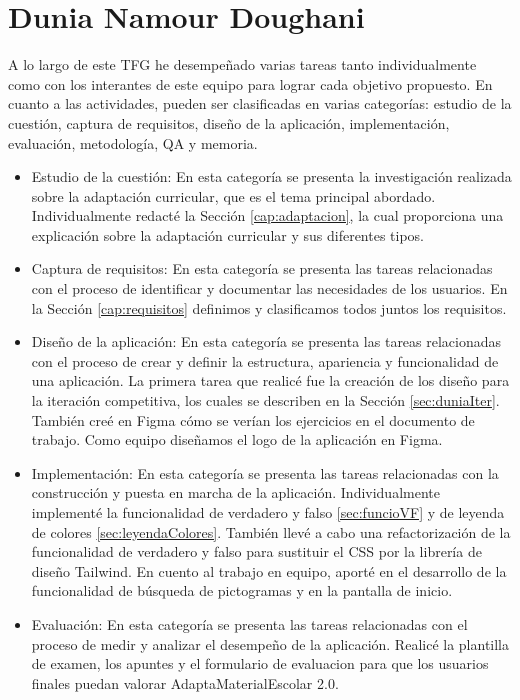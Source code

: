 \section{Dunia Namour Doughani}
A lo largo de este TFG he desempeñado varias tareas tanto individualmente como con los interantes de este equipo para lograr cada objetivo propuesto. En cuanto a las actividades, pueden ser clasificadas en varias categorías: estudio de la cuestión, captura de requisitos, diseño de la aplicación, implementación, evaluación, metodología, QA y memoria.
\begin{itemize}
    \item  Estudio de la cuestión: En esta categoría se presenta la investigación realizada sobre la adaptación curricular, que es el tema principal abordado. Individualmente redacté la Sección \ref{cap:adaptacion}, la cual proporciona una explicación sobre la adaptación curricular y sus diferentes tipos.
    \item Captura de requisitos: En esta categoría se presenta las tareas relacionadas con el proceso de identificar y documentar las necesidades de los usuarios. En la Sección \ref{cap:requisitos} definimos y clasificamos todos juntos los requisitos. 
    \item Diseño de la aplicación: En esta categoría se presenta las tareas relacionadas con el proceso de crear y definir la estructura, apariencia y funcionalidad de una aplicación. La primera tarea que realicé fue la creación de los diseño para la iteración competitiva, los cuales se describen en la Sección \ref{sec:duniaIter}. También creé en Figma cómo se verían los ejercicios en el documento de trabajo. Como equipo diseñamos el logo de la aplicación en Figma.
    \item Implementación: En esta categoría se presenta las tareas relacionadas con la construcción y puesta en marcha de la aplicación. Individualmente implementé la funcionalidad de verdadero y falso \ref{sec:funcioVF} y de leyenda de colores \ref{sec:leyendaColores}. También llevé a cabo una refactorización de la funcionalidad de verdadero y falso para sustituir el CSS por la librería de diseño Tailwind. En cuento al trabajo en equipo, aporté en el desarrollo de la funcionalidad de búsqueda de pictogramas y en la pantalla de inicio.
    \item Evaluación: En esta categoría se presenta las tareas relacionadas con el proceso de medir y analizar el desempeño de la aplicación. Realicé la plantilla de examen, los apuntes y el formulario de evaluacion para que los usuarios finales puedan valorar AdaptaMaterialEscolar 2.0.

\end{itemize}
